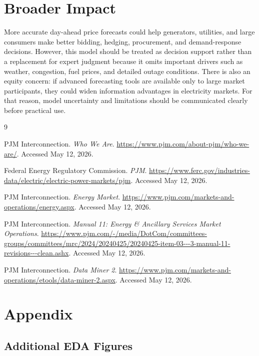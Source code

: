 \documentclass{article}
\begin{document}
\section{Broader Impact}

More accurate day-ahead price forecasts could help generators, utilities, and large consumers make better bidding, hedging, procurement, and demand-response decisions. However, this model should be treated as decision support rather than a replacement for expert judgment because it omits important drivers such as weather, congestion, fuel prices, and detailed outage conditions. There is also an equity concern: if advanced forecasting tools are available only to large market participants, they could widen information advantages in electricity markets. For that reason, model uncertainty and limitations should be communicated clearly before practical use.

{\small
\begin{thebibliography}{9}

PJM Interconnection. \textit{Who We Are}. 
\url{https://www.pjm.com/about-pjm/who-we-are/}. Accessed May 12, 2026.

Federal Energy Regulatory Commission. \textit{PJM}. 
\url{https://www.ferc.gov/industries-data/electric/electric-power-markets/pjm}. Accessed May 12, 2026.

PJM Interconnection. \textit{Energy Market}. 
\url{https://www.pjm.com/markets-and-operations/energy.aspx}. Accessed May 12, 2026.

PJM Interconnection. \textit{Manual 11: Energy \& Ancillary Services Market Operations}. 
\url{https://www.pjm.com/-/media/DotCom/committees-groups/committees/mrc/2024/20240425/20240425-item-03---3-manual-11-revisions---clean.ashx}. Accessed May 12, 2026.

PJM Interconnection. \textit{Data Miner 2}. 
\url{https://www.pjm.com/markets-and-operations/etools/data-miner-2.aspx}. Accessed May 12, 2026.

\end{thebibliography}
}

\appendix

\section{Appendix}

\subsection{Additional EDA Figures}
\end{document}
